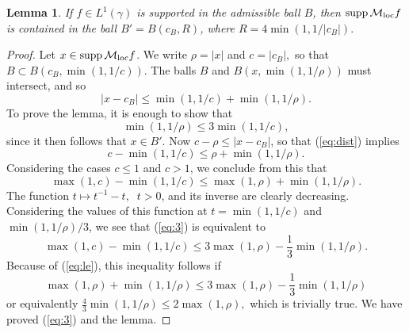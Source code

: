 \documentclass{amsart}                 %
\newtheorem{lemma}[theorem]{Lemma}
\numberwithin{equation}{section}
\newcommand\1{{\bf 1}}
\newcommand\cM{\mathcal{M}}  \newcommand\fM{\mathfrak{M}}
\newcommand\mlo {\cM_{\textnormal{loc}}}
\newcommand\ga{\gamma}    \newcommand\Ga{\Gamma}
\newcommand\supp{\mathrm{supp}\,}
\begin{document}
\begin{lemma}\label{supp}
  If $f \in L^1(\ga)$ is supported in the admissible ball $B$,
then $\supp \mlo f$ is contained in the ball   $B' = B(c_B, R)$, 
where $R = 4 \min(1, 1/|c_B|).$
\end{lemma}

\begin{proof}
  Let $x \in \supp \mlo f$.   We write $\rho = |x|$ and $c = |c_B|,$
so that $B \subset B(c_B, \min(1,1/c))$. The balls $B$ and 
$B(x,  \min(1,1/\rho))$ must intersect, and so
\begin{equation}
  \label{eq:dist}
  |x-c_B| \le \min(1,1/c) + \min(1,1/\rho).
\end{equation}
To prove the lemma, it is enough to show that 
\begin{equation}
  \label{eq:3}
  \min(1,1/\rho) \le 3 \min(1,1/c),
\end{equation}
since it then follows that $x \in B'$.
Now $c - \rho \le |x-c_B|$, so that (\ref{eq:dist}) implies 
\[
c - \min(1,1/c) \le \rho + \min(1,1/\rho).
\]
Considering the cases $c \le 1$ and $c > 1$, we conclude from this that
\begin{equation}
  \label{eq:le}
  \max(1,c)  - \min(1,1/c) \le \max(1,\rho)   + \min(1,1/\rho).
\end{equation}
The function $t \mapsto t^{-1} - t, \;\; t>0$, and its inverse
are clearly decreasing. Considering the values of this function at
$t = \min(1,1/c)$ and $\min(1,1/\rho)/3$, we see that (\ref{eq:3}) 
is equivalent to 
\[
\max(1,c)  - \min(1,1/c) \le 3\max(1,\rho)   - \frac13 \min(1,1/\rho).
\]
Because of (\ref{eq:le}), this inequality follows if 
\[
\max(1,\rho)   + \min(1,1/\rho) \le 3\max(1,\rho)   - \frac13 \min(1,1/\rho)
\]
or equivalently $\frac43 \min(1,1/\rho) \le 2\max(1,\rho),$ which is
trivially true. We have proved (\ref{eq:3}) and the lemma.
\end{proof}
\end{document}
